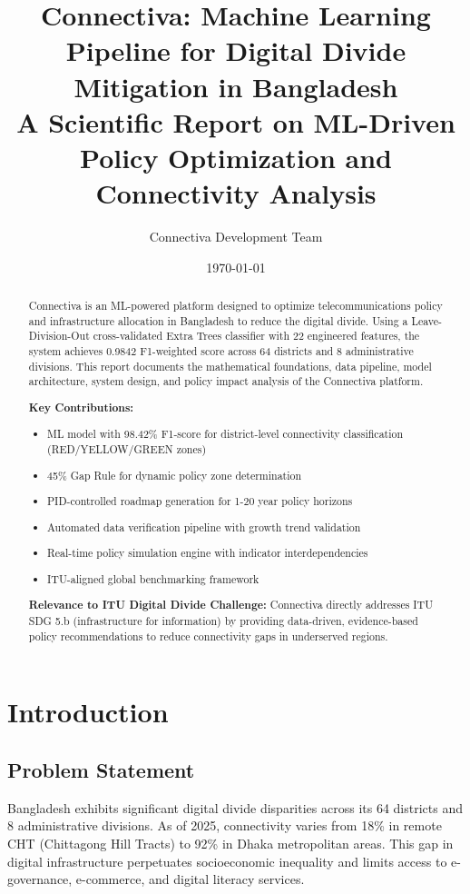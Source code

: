 \documentclass[11pt,a4paper]{article}
\title{%
  \textbf{Connectiva: Machine Learning Pipeline for Digital Divide Mitigation in Bangladesh}\\
  \large A Scientific Report on ML-Driven Policy Optimization and Connectivity Analysis
}
\author{Connectiva Development Team}
\date{\today}
\begin{document}
\maketitle

\begin{abstract}
Connectiva is an ML-powered platform designed to optimize telecommunications policy and infrastructure allocation in Bangladesh to reduce the digital divide. Using a Leave-Division-Out cross-validated Extra Trees classifier with 22 engineered features, the system achieves 0.9842 F1-weighted score across 64 districts and 8 administrative divisions. This report documents the mathematical foundations, data pipeline, model architecture, system design, and policy impact analysis of the Connectiva platform.

\textbf{Key Contributions:}
\begin{itemize}
  \item ML model with 98.42\% F1-score for district-level connectivity classification (RED/YELLOW/GREEN zones)
  \item 45\% Gap Rule for dynamic policy zone determination
  \item PID-controlled roadmap generation for 1-20 year policy horizons
  \item Automated data verification pipeline with growth trend validation
  \item Real-time policy simulation engine with indicator interdependencies
  \item ITU-aligned global benchmarking framework
\end{itemize}

\textbf{Relevance to ITU Digital Divide Challenge:} Connectiva directly addresses ITU SDG 5.b (infrastructure for information) by providing data-driven, evidence-based policy recommendations to reduce connectivity gaps in underserved regions.

\end{abstract}

\tableofcontents
\newpage

\section{Introduction}

\subsection{Problem Statement}
Bangladesh exhibits significant digital divide disparities across its 64 districts and 8 administrative divisions. As of 2025, connectivity varies from 18\% in remote CHT (Chittagong Hill Tracts) to 92\% in Dhaka metropolitan areas. This gap in digital infrastructure perpetuates socioeconomic inequality and limits access to e-governance, e-commerce, and digital literacy services.
\end{document}
